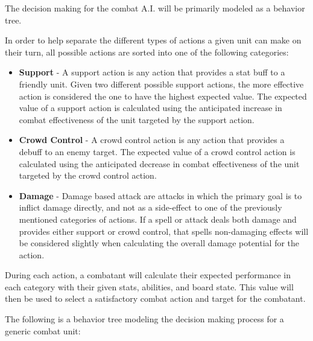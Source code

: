 \documentclass[12pt,a4paper]{report}
\begin{document}
		The decision making for the combat A.I. will be primarily modeled as a behavior tree. 
		
		In order to help separate the different types of actions a given unit can make on their turn, all possible actions are sorted into one of the following categories:
		
		\begin{itemize}
			\item \textbf{Support} - A support action is any action that provides a stat buff to a friendly unit. Given two different possible support actions, the more effective action is considered the one to have the highest expected value. The expected value of a support action is calculated using the anticipated increase in combat effectiveness of the unit targeted by the support action. 
			\item \textbf{Crowd Control} - A crowd control action is any action that provides a debuff to an enemy target. The expected value of a crowd control action is calculated using the anticipated decrease in combat effectiveness of the unit targeted by the crowd control action.
			\item \textbf{Damage} - Damage based attack are attacks in which the primary goal is to inflict damage directly, and not as a side-effect to one of the previously mentioned categories of actions. If a spell or attack deals both damage and provides either support or crowd control, that spells non-damaging effects will be considered slightly when calculating the overall damage potential for the action. 
		\end{itemize}
		
		During each action, a combatant will calculate their expected performance in each category with their given stats, abilities, and board state. This value will then be used to select a satisfactory combat action and target for the combatant. 
		
		The following is a behavior tree modeling the decision making process for a generic combat unit:
		
\end{document}
